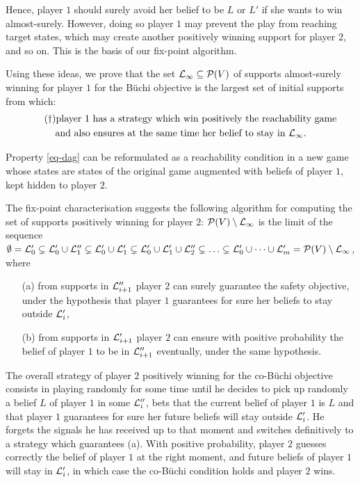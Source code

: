 Hence, player $1$ should surely avoid her belief to be $L$
or $L'$ if she wants to win almost-surely.
However, doing so player $1$ may prevent the play from
reaching target states, which may create another positively winning
support for player $2$, and so on. This is the basis of our fix-point algorithm.

Using these ideas, we prove that the set
$\mathcal{L}_\infty\subseteq \mathcal{P}(V)$ of supports almost-surely
winning for player $1$ for the B\"uchi objective is the largest set of
initial supports from which:
\begin{multline}
\label{eq-dag}
\tag{$\dag$}
\textrm{player $1$ has a strategy
  which win positively the reachability game}\\
\textrm{and also ensures at the same time
  her belief to stay in } \mathcal{L}_\infty .
\end{multline}

Property \eqref{eq-dag} can be reformulated as a reachability
condition in a new game whose states are states of the original game
augmented with beliefs of player $1$, kept hidden to player $2$.

The fix-point characterisation suggests the following algorithm for
computing the set of supports positively winning for player $2$:
$\mathcal{P}(V)\setminus\mathcal{L}_\infty$ is the limit of the sequence
$\emptyset=\mathcal{L}_0'\subsetneq \mathcal{L}_0'\cup \mathcal{L}_1''\subsetneq\mathcal{L}_0'\cup
\mathcal{L}_1'\subsetneq \mathcal{L}_0'\cup \mathcal{L}_1'\cup \mathcal{L}_2''\subsetneq\ldots
\subsetneq \mathcal{L}_0'\cup \cdots \cup \mathcal{L}'_m
=\mathcal{P}(V)\setminus\mathcal{L}_\infty$, where
\begin{itemize}
\item[(a)]
from supports in $\mathcal{L}''_{i+1}$ player $2$ can surely guarantee the safety objective,
under the hypothesis that player $1$ 
{guarantees for sure} her beliefs to stay outside $\mathcal{L}'_i$,
\item[(b)]
from supports in $\mathcal{L}'_{i+1}$ player $2$ can ensure with positive probability the belief of player
$1$ to be in $\mathcal{L}''_{i+1}$ eventually,
under the same hypothesis.
\end{itemize}

The overall strategy of player $2$ positively winning for the co-B\"uchi objective
consists in playing randomly for some time until he decides to pick
up randomly a belief $L$ of player $1$ in some $\mathcal{L}''_i$,
bets that the current belief of player $1$ is $L$ and that player $1$
guarantees for sure
her future beliefs 
will stay outside $\mathcal{L}'_i$.
He forgets
the signals he has received up to that moment and switches
definitively to a strategy which guarantees (a).  With positive
probability, player $2$ %
guesses correctly the belief of player $1$ at the right moment, and
future beliefs of player $1$ will stay in $\mathcal{L}'_i$, in which case the
co-B\"uchi condition holds and player $2$ wins.

